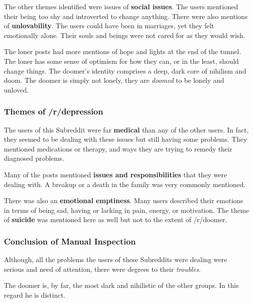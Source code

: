 \documentclass[../report.tex]{subfiles}
\begin{document}
The other themes identified were issues of \textbf{social issues}. The users mentioned their being too shy and introverted to change anything. 
There were also mentions of \textbf{unlovability}.
The users could have been in marriages, yet they felt emotionally alone.
Their souls and beings were not cared for as they would wish.

The loner posts had more mentions of hope and lights at the end of the tunnel. 
The loner has some sense of optimism for how they can, or in the least, should change things.
The doomer's identity comprises a deep, dark core of nihilism and doom.
The doomer is simply not lonely, they are \textit{doomed} to be lonely and unloved. 

\subsubsection{Themes of /r/depression}
The users of this Subreddit were far \textbf{medical} than any of the other users. 
In fact, they seemed to be dealing with these issues but still having some problems. 
They mentioned medications or therapy, and ways they are trying to remedy their diagnosed problems. 

Many of the posts mentioned \textbf{issues and responsibilities} that they were dealing with.
A breakup or a death in the family was very commonly mentioned. 

There was also an \textbf{emotional emptiness}. Many users described their emotions in terms of being sad, having or lacking in pain, energy, or motivation. 
The theme of \textbf{suicide} was mentioned here as well but not to the extent of /r/doomer.

\subsubsection{Conclusion of Manual Inspection}
Although, all the problems the users of these Subreddits were dealing were serious and need of attention, there were degrees to their \textit{troubles}.

The doomer is, by far, the most dark and nihilistic of the other groups. In this regard he is distinct. 
\end{document}
